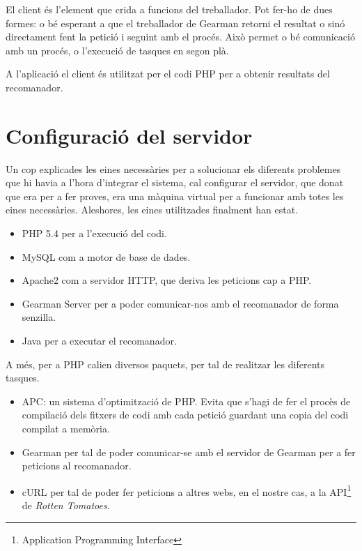 El client és l'element que crida a funcions del treballador. Pot fer-ho de dues formes: o bé esperant a que el treballador de Gearman retorni el resultat o sinó directament fent la petició i seguint amb el procés. Això permet o bé comunicació amb un procés, o l'execució de tasques en segon plà.

A l'aplicació el client és utilitzat per el codi PHP per a obtenir resultats del recomanador.

\section{Configuració del servidor}

Un cop explicades les eines necessàries per a solucionar els diferents problemes que hi havia a l'hora d'integrar el sistema, cal configurar el servidor, que donat que era per a fer proves, era una màquina virtual per a funcionar amb totes les eines necessàries. Aleshores, les eines utilitzades finalment han estat.

\begin{itemize}
	\item{PHP 5.4} per a l'execució del codi.
	\item{MySQL} com a motor de base de dades.
	\item{Apache2} com a servidor HTTP, que deriva les peticions cap a PHP.
	\item{Gearman Server} per a poder comunicar-nos amb el recomanador de forma senzilla.
	\item{Java} per a executar el recomanador.
\end{itemize}

A més, per a PHP calien diversos paquets, per tal de realitzar les diferents tasques.

\begin{itemize}
	\item{APC}: un sistema d'optimització de PHP. Evita que s'hagi de fer el procès de compilació dels fitxers de codi amb cada petició guardant una copia del codi compilat a memòria.
	\item{Gearman} per tal de poder comunicar-se amb el servidor de Gearman per a fer peticions al recomanador.
	\item{cURL} per tal de poder fer peticions a altres webs, en el nostre cas, a la API\footnote{Application Programming Interface} de \emph{Rotten Tomatoes}.
\end{itemize}